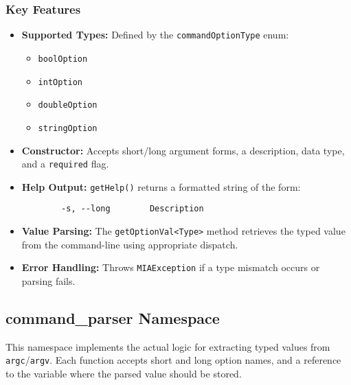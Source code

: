 \subsubsection*{Key Features}
\begin{itemize}
	\item \textbf{Supported Types:} Defined by the \texttt{commandOptionType} enum:
	\begin{itemize}
		\item \texttt{boolOption}
		\item \texttt{intOption}
		\item \texttt{doubleOption}
		\item \texttt{stringOption}
	\end{itemize}
	
	\item \textbf{Constructor:} Accepts short/long argument forms, a description, data type, and a \texttt{required} flag.
	
	\item \textbf{Help Output:} \texttt{getHelp()} returns a formatted string of the form:
	\begin{verbatim}
		-s, --long        Description
	\end{verbatim}
	
	\item \textbf{Value Parsing:} The \texttt{getOptionVal<Type>} method retrieves the typed value from the command-line using appropriate dispatch.
	
	\item \textbf{Error Handling:} Throws \texttt{MIAException} if a type mismatch occurs or parsing fails.
\end{itemize}

\subsection{command\_parser Namespace}

This namespace implements the actual logic for extracting typed values from \texttt{argc}/\texttt{argv}. Each function accepts short and long option names, and a reference to the variable where the parsed value should be stored.

